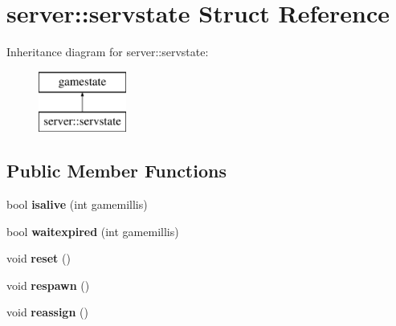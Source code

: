 \hypertarget{structserver_1_1servstate}{}\section{server\+:\+:servstate Struct Reference}
\label{structserver_1_1servstate}
Inheritance diagram for server\+:\+:servstate\+:\begin{figure}[H]
\begin{center}
\leavevmode
\includegraphics[height=2.000000cm]{structserver_1_1servstate}
\end{center}
\end{figure}
\subsection*{Public Member Functions}
\begin{DoxyCompactItemize}
\item 
\mbox{\label{structserver_1_1servstate_a5425b8a2aa166012165431e52bad0e4f}} 
bool {\bfseries isalive} (int gamemillis)
\item 
\mbox{\label{structserver_1_1servstate_a7725a8a6d50112ecee89e34d7b10b690}} 
bool {\bfseries waitexpired} (int gamemillis)
\item 
\mbox{\label{structserver_1_1servstate_a59c78f07e411c5e81c3741284f31d4eb}} 
void {\bfseries reset} ()
\item 
\mbox{\label{structserver_1_1servstate_a5f49277096e223515717dd23775b2459}} 
void {\bfseries respawn} ()
\item 
\mbox{\label{structserver_1_1servstate_a0b42e46ebc2257b23223ac3258160edf}} 
void {\bfseries reassign} ()
\end{DoxyCompactItemize}
